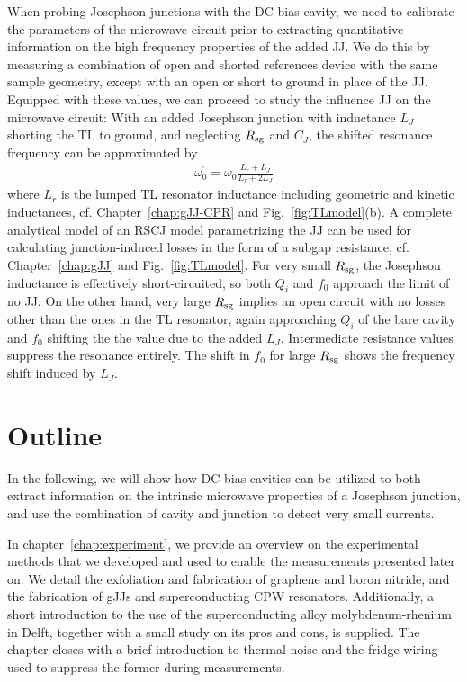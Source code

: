 When probing Josephson junctions with the DC bias cavity, we need to calibrate the parameters of the microwave circuit prior to extracting quantitative information on the high frequency properties of the added JJ.
%
We do this by measuring a combination of open and shorted references device with the same sample geometry, except with an open or short to ground in place of the JJ.
%
Equipped with these values, we can proceed to study the influence JJ on the microwave circuit:
%
With an added Josephson junction with inductance $L_J$ shorting the TL to ground, and neglecting $R_{\rm sg}$ and $C_{J}$, the shifted resonance frequency can be approximated by
%
\begin{align}
\omega_0^\prime = \omega_0\frac{L_r+L_J}{L_r+2L_J}
\label{eq:intro-omega0p}
\end{align}
%
where $L_r$ is the lumped TL resonator inductance including geometric and kinetic inductances, cf. Chapter~\ref{chap:gJJ-CPR} and Fig.~\ref{fig:TLmodel}(b).
%
A complete analytical model of an RSCJ model parametrizing the JJ can be used for calculating junction-induced losses in the form of a subgap resistance, cf. Chapter~\ref{chap:gJJ} and Fig.~\ref{fig:TLmodel}.
%
For very small $R_{\rm sg}$, the Josephson inductance is effectively short-circuited, so both $Q_i$ and $f_0$ approach the limit of no JJ.
%
On the other hand, very large $R_{\rm sg}$ implies an open circuit with no losses other than the ones in the TL resonator, again approaching $Q_i$ of the bare cavity and $f_0$ shifting the the value due to the added $L_J$.
%
Intermediate resistance values suppress the resonance entirely.
%
The shift in $f_0$ for large $R_{\rm sg}$ shows the frequency shift induced by $L_J$.



\section{Outline}

In the following, we will show how DC bias cavities can be utilized to both extract information on the intrinsic microwave properties of a Josephson junction, and use the combination of cavity and junction to detect very small currents.

In chapter~\ref{chap:experiment}, we provide an overview on the experimental methods that we developed and used to enable the measurements presented later on.
%
We detail the exfoliation and fabrication of graphene and boron nitride, and the fabrication of gJJs and superconducting CPW resonators.
%
Additionally, a short introduction to the use of the superconducting alloy molybdenum-rhenium in Delft, together with a small study on its pros and cons, is supplied.
%
The chapter closes with a brief introduction to thermal noise and the fridge wiring used to suppress the former during measurements.

